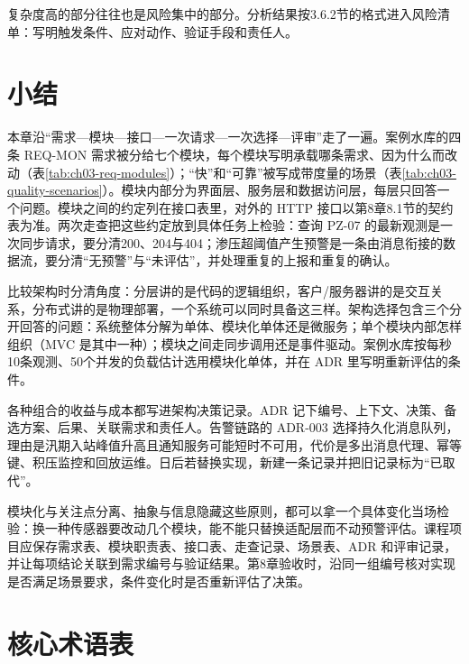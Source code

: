 复杂度高的部分往往也是风险集中的部分。分析结果按3.6.2节的格式进入风险清单：写明触发条件、应对动作、验证手段和责任人。

\section*{小结}

本章沿“需求—模块—接口—一次请求—一次选择—评审”走了一遍。案例水库的四条 REQ-MON 需求被分给七个模块，每个模块写明承载哪条需求、因为什么而改动（表\ref{tab:ch03-req-modules}）；“快”和“可靠”被写成带度量的场景（表\ref{tab:ch03-quality-scenarios}）。模块内部分为界面层、服务层和数据访问层，每层只回答一个问题。模块之间的约定列在接口表里，对外的 HTTP 接口以第8章8.1节的契约表为准。两次走查把这些约定放到具体任务上检验：查询 PZ-07 的最新观测是一次同步请求，要分清200、204与404；渗压超阈值产生预警是一条由消息衔接的数据流，要分清“无预警”与“未评估”，并处理重复的上报和重复的确认。

比较架构时分清角度：分层讲的是代码的逻辑组织，客户\slash 服务器讲的是交互关系，分布式讲的是物理部署，一个系统可以同时具备这三样。架构选择包含三个分开回答的问题：系统整体分解为单体、模块化单体还是微服务；单个模块内部怎样组织（MVC 是其中一种）；模块之间走同步调用还是事件驱动。案例水库按每秒10条观测、50个并发的负载估计选用模块化单体，并在 ADR 里写明重新评估的条件。

各种组合的收益与成本都写进架构决策记录。ADR 记下编号、上下文、决策、备选方案、后果、关联需求和责任人。告警链路的 ADR-003 选择持久化消息队列，理由是汛期入站峰值升高且通知服务可能短时不可用，代价是多出消息代理、幂等键、积压监控和回放运维。日后若替换实现，新建一条记录并把旧记录标为“已取代”。

模块化与关注点分离、抽象与信息隐藏这些原则，都可以拿一个具体变化当场检验：换一种传感器要改动几个模块，能不能只替换适配层而不动预警评估。课程项目应保存需求表、模块职责表、接口表、走查记录、场景表、ADR 和评审记录，并让每项结论关联到需求编号与验证结果。第8章验收时，沿同一组编号核对实现是否满足场景要求，条件变化时是否重新评估了决策。

\section*{核心术语表}

